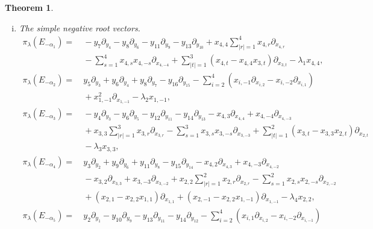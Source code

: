 \documentclass[12pt]{article}
\numberwithin{equation}{section}
\newtheorem{theorem}{Theorem}[section]
\theoremstyle{definition}
\theoremstyle{remark}
\begin{document}
\begin{theorem}
\begin{enumerate}[(i)]
\begin{align}
			&\:+x_{4,1}\partial_{x_{4,1}}+x_{4,-2}\partial_{x_{4,-2}}+x_{4,-3}\partial_{x_{4,-3}}+x_{4,-4}\partial_{x_{4,-4}}\nonumber\\
			&\:+x_{3,-3}\partial_{x_{3,-3}}+x_{2,1}\partial_{x_{2,1}}+x_{2,-2}\partial_{x_{2,-2}}+x_{1,1}\partial_{x_{1,1}}+\lambda_6.\label{3.102}
		\end{align}
			\item The simple negative root vectors.
		\begin{align}
			\pi_{\lambda}(E_{-\alpha_1})=&\:-y_7\partial_{y_4}-y_8\partial_{y_6}-y_{11}\partial_{y_9}-y_{13}\partial_{y_{10}}+x_{4,4}\mathop{\textstyle\sum}\limits_{|r|=1}^4x_{4,r}\partial_{x_{4,r}}\nonumber\\
			&\:-\mathop{\textstyle\sum}\limits_{s=1}^4x_{4,s}x_{4,-s}\partial_{x_{4,-4}}+\mathop{\textstyle\sum}\limits_{|t|=1}^3(x_{4,t}-x_{4,4}x_{3,t})\partial_{x_{3,t}}-\lambda_1x_{4,4},\label{3.85}\\
			\pi_{\lambda}(E_{-\alpha_2})=&\:y_5\partial_{y_3}+y_6\partial_{y_4}+y_8\partial_{y_7}-y_{16}\partial_{y_{15}}-\mathop{\textstyle\sum}\limits_{i=2}^4(x_{i,-1}\partial_{x_{i,2}}-x_{i,-2}\partial_{x_{i,1}})\nonumber\\
			&\:+x_{1,-1}^2\partial_{x_{1,-1}}-\lambda_2x_{1,-1},\\
			\pi_{\lambda}(E_{-\alpha_3})=&\:-y_4\partial_{y_3}-y_{6}\partial_{y_5}-y_{12}\partial_{y_{11}}-y_{14}\partial_{y_{13}}-x_{4,3}\partial_{x_{4,4}}+x_{4,-4}\partial_{x_{4,-3}}\nonumber\\
			&\:+x_{3,3}\mathop{\textstyle\sum}\limits_{|r|=1}^3x_{3,r}\partial_{x_{3,r}}-\mathop{\textstyle\sum}\limits_{s=1}^3x_{3,s}x_{3,-s}\partial_{x_{3,-3}}+\mathop{\textstyle\sum}\limits_{|t|=1}^2(x_{3,t}-x_{3,3}x_{2,t})\partial_{x_{2,t}}\nonumber\\
			&\:-\lambda_3x_{3,3},\\
			\pi_{\lambda}(E_{-\alpha_4})=&\:y_3\partial_{y_2}+y_{9}\partial_{y_6}+y_{11}\partial_{y_8}-y_{15}\partial_{y_{14}}-x_{4,2}\partial_{x_{4,3}}+x_{4,-3}\partial_{x_{4,-2}}\nonumber\\
			&\:-x_{3,2}\partial_{x_{3,3}}+x_{3,-3}\partial_{x_{3,-2}}+x_{2,2}\mathop{\textstyle\sum}\limits_{|r|=1}^2x_{2,r}\partial_{x_{2,r}}-\mathop{\textstyle\sum}\limits_{s=1}^2x_{2,s}x_{2,-s}\partial_{x_{2,-2}}\nonumber\\
			&\:+(x_{2,1}-x_{2,2}x_{1,1})\partial_{x_{1,1}}+(x_{2,-1}-x_{2,2}x_{1,-1})\partial_{x_{1,-1}}-\lambda_4x_{2,2},\\
			\pi_{\lambda}(E_{-\alpha_5})=&\:y_2\partial_{y_1}-y_{10}\partial_{y_9}-y_{13}\partial_{y_{11}}-y_{14}\partial_{y_{12}}-\mathop{\textstyle\sum}\limits_{i=2}^4(x_{i,1}\partial_{x_{i,2}}-x_{i,-2}\partial_{x_{i,-1}})\nonumber\\

\end{align}
\end{enumerate}
\end{theorem}
\end{document}
